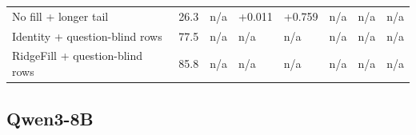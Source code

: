 \documentclass[11pt]{article}
\begin{document}
\begin{table}[H]
\begin{tabular}{llllllll}
No fill + longer tail & 26.3 & n/\allowbreak{}a & +0.011 & +0.759 & n/\allowbreak{}a & n/\allowbreak{}a & n/\allowbreak{}a \\
Identity + question-blind rows & 77.5 & n/\allowbreak{}a & n/\allowbreak{}a & n/\allowbreak{}a & n/\allowbreak{}a & n/\allowbreak{}a & n/\allowbreak{}a \\
RidgeFill + question-blind rows & 85.8 & n/\allowbreak{}a & n/\allowbreak{}a & n/\allowbreak{}a & n/\allowbreak{}a & n/\allowbreak{}a & n/\allowbreak{}a \\
\bottomrule
\end{tabular}
\end{table}


\subsection{Qwen3-8B}\label{sec:A.3}
\end{document}
